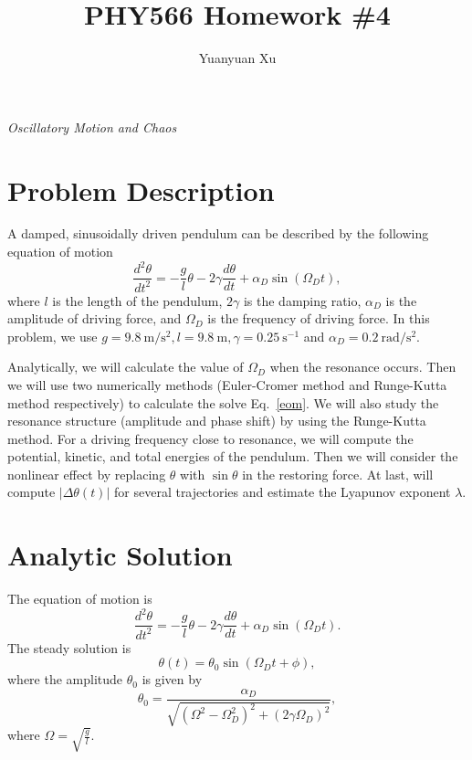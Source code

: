 \documentclass[a4paper]{article}
\title{\textbf{PHY566 Homework \#4}}
\author{Yuanyuan Xu}
\begin{document}
	\maketitle
	\centerline{\emph{\Large{Oscillatory Motion and Chaos}}}
	\tableofcontents
	\newpage
	\section{Problem Description}
	A damped, sinusoidally driven pendulum can be described by the following equation of motion
	\begin{equation}
		\frac{d^2 \theta}{dt^2} = - \frac{g}{l}\theta - 2\gamma \frac{d\theta}{dt} + {\alpha}_D \sin({\Omega}_D t),
	\end{equation}
	where $l$ is the length of the pendulum, $2\gamma$ is the damping ratio, $\alpha _D$ is the amplitude of driving force, and $\Omega _D$ is the frequency of driving force. In this problem, we use $g = 9.8 \mathrm{~m/s^2}, l = 9.8 \mathrm{~m}, \gamma = 0.25 \mathrm{~s^{-1}}$ and $\alpha _D = 0.2 \mathrm{~rad/s^2}$. 
	
	Analytically, we will calculate the value of $\Omega _D$ when the resonance occurs. Then we will use two numerically methods (Euler-Cromer method and Runge-Kutta method respectively) to calculate the solve Eq.~\eqref{eom}. We will also study the resonance structure (amplitude and phase shift) by using the Runge-Kutta method. For a driving frequency close to resonance, we will compute the potential, kinetic, and total energies of the pendulum. Then we will consider the nonlinear effect by replacing $\theta$ with $\sin\theta$ in the restoring force. At last, will compute $|\Delta\theta(t)|$ for several trajectories and estimate the Lyapunov exponent $\lambda$.
	\section{Analytic Solution} \label{analytically solution}
	The equation of motion is 
	\begin{equation} \label{eom}
		\frac{d^2 \theta}{dt^2} = - \frac{g}{l}\theta - 2\gamma \frac{d\theta}{dt} + {\alpha}_D \sin({\Omega}_D t).
	\end{equation}
	The steady solution is 
	\begin{equation}
		\theta(t) = {\theta}_0 \sin({\Omega}_D t + \phi),
	\end{equation}
	where the amplitude ${\theta}_0$ is given by
	\begin{equation}
		{\theta}_0 = \frac{{\alpha}_D}{\sqrt{({\Omega}^2 - {\Omega}_D^2)^2 + (2\gamma{\Omega}_D)^2}},
	\end{equation}
	where $\Omega = \sqrt{\frac{g}{l}}$. 
	
\end{document}
